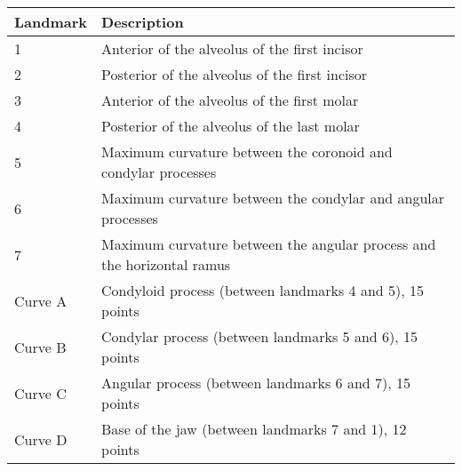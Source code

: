 

\begin{tabular}[t]{p{} p{}}		
\hline
\textbf{Landmark} & \textbf{Description} \\
\hline
1 & Anterior of the alveolus of the first incisor \\
2 & Posterior of the alveolus of the first incisor \\
3 &	Anterior of the alveolus of the first molar \\
4 & Posterior of the alveolus of the last molar \\
5 & Maximum curvature between the coronoid and condylar processes\\
6 & Maximum curvature between the condylar and angular processes  \\
7 &	Maximum curvature between the angular process and the horizontal ramus \\
\hline
Curve A & Condyloid process (between landmarks 4 and 5), 15 points\\
Curve B & Condylar process (between landmarks 5 and 6), 15 points \\
Curve C & Angular process (between landmarks 6 and 7), 15 points  \\
Curve D & Base of the jaw (between landmarks 7 and 1), 12 points  \\
\hline
\end{tabular}
